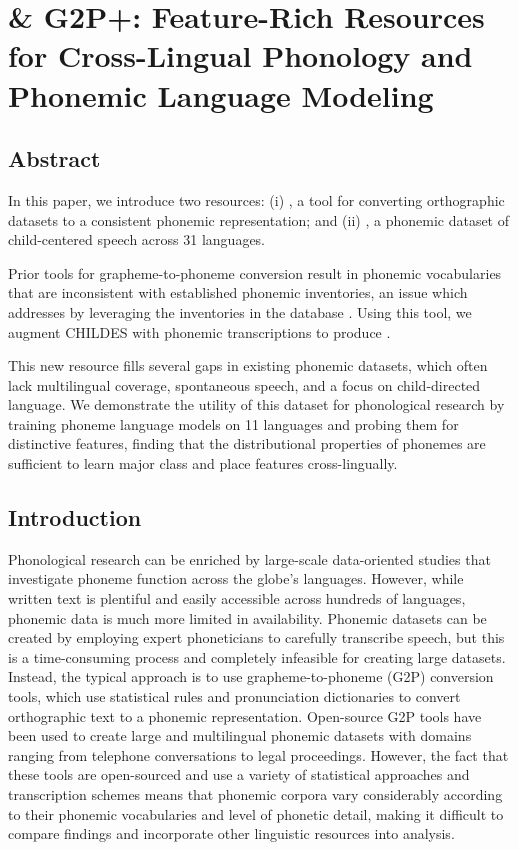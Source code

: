 \chapter{\ipachildes \& G2P+: Feature-Rich Resources for Cross-Lingual Phonology and Phonemic Language Modeling}

\section{Abstract}

In this paper, we introduce two resources: (i) \corpusphonemizer, a tool for converting orthographic datasets to a consistent phonemic representation; and (ii) \ipachildes, a phonemic dataset of child-centered speech across 31 languages. 

Prior tools for grapheme-to-phoneme conversion result in phonemic vocabularies that are inconsistent with established phonemic inventories, an issue which \corpusphonemizer addresses by leveraging the inventories in the \phoible database \citep{phoible}. 
Using this tool, we augment CHILDES \citep{macwhinney1985child} with phonemic transcriptions to produce \ipachildes.

This new resource fills several gaps in existing phonemic datasets, which often lack multilingual coverage, spontaneous speech, and a focus on child-directed language.
We demonstrate the utility of this dataset for phonological research by training phoneme language models on 11 languages and probing them for distinctive features, finding that the distributional properties of phonemes are sufficient to learn major class and place features cross-lingually.

\section{Introduction}

Phonological research can be enriched by large-scale data-oriented studies that investigate phoneme function across the globe's languages. However, while written text is plentiful and easily accessible across hundreds of languages, phonemic data is much more limited in availability. Phonemic datasets can be created by employing expert phoneticians to carefully transcribe speech, but this is a time-consuming process and completely infeasible for creating large datasets. Instead, the typical approach is to use grapheme-to-phoneme (G2P) conversion tools, which use statistical rules and pronunciation dictionaries to convert orthographic text to a phonemic representation. Open-source G2P tools have been used to create large and multilingual phonemic datasets with domains ranging from telephone conversations to legal proceedings. However, the fact that these tools are open-sourced and use a variety of statistical approaches and transcription schemes means that phonemic corpora vary considerably according to their phonemic vocabularies and level of phonetic detail, making it difficult to compare findings and incorporate other linguistic resources into analysis.

